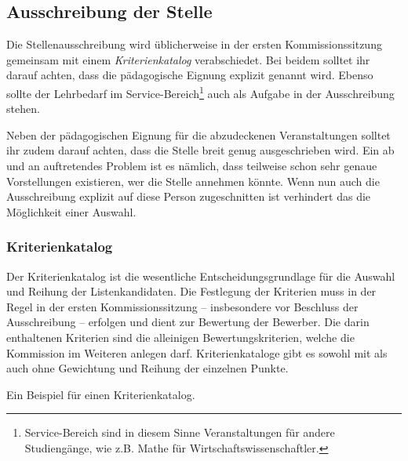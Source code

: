 \documentclass[10pt,twoside,a5paper,openright]{book}
\begin{document}
\subsection{Ausschreibung der Stelle}
Die Stellenausschreibung wird üblicherweise in der ersten Kommissionssitzung gemeinsam mit einem \emph{Kriterienkatalog} verabschiedet. Bei beidem solltet ihr darauf achten, dass die pädagogische Eignung explizit genannt wird. Ebenso sollte der Lehrbedarf im Service-Bereich\footnote{Service-Bereich sind in diesem Sinne Veranstaltungen für andere Studiengänge, wie z.B. Mathe für Wirtschaftswissenschaftler.} auch als Aufgabe in der Ausschreibung stehen.

Neben der pädagogischen Eignung für die abzudeckenen Veranstaltungen solltet ihr zudem darauf achten, dass die Stelle breit genug ausgeschrieben wird. Ein ab und an auftretendes Problem ist es nämlich, dass teilweise schon sehr genaue Vorstellungen existieren, wer die Stelle annehmen könnte. Wenn nun auch die Ausschreibung explizit auf diese Person zugeschnitten ist verhindert das die Möglichkeit einer Auswahl. 

\subsubsection*{Kriterienkatalog}\label{kriterienkatalog}
Der Kriterienkatalog ist die wesentliche Entscheidungsgrundlage für die Auswahl und Reihung der Listenkandidaten. Die Festlegung der Kriterien muss in der Regel in der ersten Kommissionssitzung -- insbesondere vor Beschluss der Ausschreibung -- erfolgen und dient zur Bewertung der Bewerber. Die darin enthaltenen Kriterien sind die alleinigen Bewertungskriterien, welche die Kommission im Weiteren anlegen darf. Kriterienkataloge gibt es sowohl mit als auch ohne Gewichtung und Reihung der einzelnen Punkte. 

\begin{center}
\begin{center}
Ein Beispiel für einen Kriterienkatalog.
\end{center}
\end{center}
\end{document}
